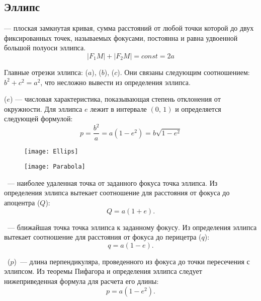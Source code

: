 \subsection{Эллипс}
{\bfseries {}} --- плоская замкнутая кривая, сумма 
расстояний от любой точки которой до двух фиксированных 
точек, называемых фокусами, постоянна и равна 
удвоенной большой полуоси эллипса.
\begin{equation}|F_1 M|+|F_2M|=const=2a
\end{equation}

Главные отрезки эллипса:  
($a$),  ($b$),  ($c$). Они связаны следующим 
соотношением: $b^2+c^2=a^2$, что несложно вывести из 
определения эллипса.

 ($e$) --- числовая 
характеристика, показывающая степень отклонения от 
окружности. Для эллипса $e$ лежит в интервале $(0, \, 1)$ и
определяется следующей формулой:\begin{equation}
p=\frac{b^2}{a}=a(1-e^2)=b\sqrt{1-e^2}
\end{equation}

\begin{figure}[h!]
	\begin{minipage}[b]{0.5\tw}
		\centering
		\texttt{[image: Ellips]}
	\end{minipage}
	\begin{minipage}[b]{0.5\tw}
		\centering
		\texttt{[image: Parabola]}
	\end{minipage}
\end{figure}

~--- наиболее удаленная точка
от заданного фокуса точка эллипса. Из определения эллипса
вытекает соотношение для расстояния от фокуса до 
апоцентра ($Q$):\begin{equation}
Q = a (1 + e).
\end{equation}

~--- ближайшая точка
точка эллипса к заданному фокусу. Из определения эллипса
вытекает соотношение для расстояния от фокуса до 
перицетра ($q$):\begin{equation}
q = a (1 - e).
\end{equation}

~($p$)~--- длина перпендикуляра,
проведенного из фокуса до точки пересечения с эллипсом.
Из теоремы Пифагора и определения эллипса следует 
нижеприведенная формула для расчета его длины:
\begin{equation}
p = a(1 - e^2).
\end{equation}

